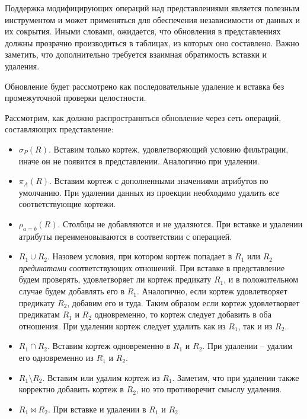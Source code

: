 Поддержка модифицирующих операций над представлениями является полезным инструментом и может
применяться для обеспечения независимости от данных и их сокрытия. Иными словами, ожидается, что
обновления в представлениях должны прозрачно производиться в таблицах, из которых оно составлено.
Важно заметить, что дополнительно требуется взаимная обратимость вставки и удаления.

\begin{remark}
	Обновление будет рассмотрено как последовательные удаление и вставка без промежуточной проверки
	целостности.
\end{remark}

Рассмотрим, как должно распространяться обновление через сеть операций, составляющих представление:

\begin{itemize}
	\item $\sigma_P (R)$. Вставим только кортеж, удовлетворяющий условию фильтрации, иначе
	      он не появится в представлении. Аналогично при удалении.
	\item $\pi_A(R)$. Вставим кортеж с дополненными значениями атрибутов по умолчанию. При
	      удалении данных из проекции необходимо удалить \textit{все} соответствующие кортежи.
	\item $\rho_{a=b}(R)$. Столбцы не добавляются и не удаляются. При вставке и удалении атрибуты
	      переименовываются в соответствии с операцией.
	\item $R_1 \cup R_2$. Назовем условия, при котором кортеж попадает в $R_1$ или
	      $R_2$
	      \textit{предикатами} соответствующих отношений. При вставке в представление будем проверять,
	      удовлетворяет ли кортеж предикату $R_1$, и в положительном случае будем добавлять
	      его в $R_1$. Аналогично, если кортеж удовлетворяет предикату $R_2$,
	      добавим его и туда. Таким образом если кортеж удовлетворяет предикатам $R_1$ и
	      $R_2$ одновременно, то кортеж следует добавить в оба отношения. При удалении
	      кортеж следует удалить как из $R_1$, так и из $R_2$.
	\item $R_1 \cap R_2$. Вставим кортеж одновременно в $R_1$ и
	      $R_2$. При удалении -- удалим его
	      одновременно из $R_1$ и $R_2$.
	\item $R_1 \setminus R_2$. Вставим или удалим кортеж из $R_1$. Заметим, что при
	      удалении также
	      корректно добавить кортеж в $R_2$, но это противоречит смыслу удаления.
	\item $R_1 \bowtie R_2$. При вставке и удалении в $R_1$ и $R_2$

\end{itemize}
